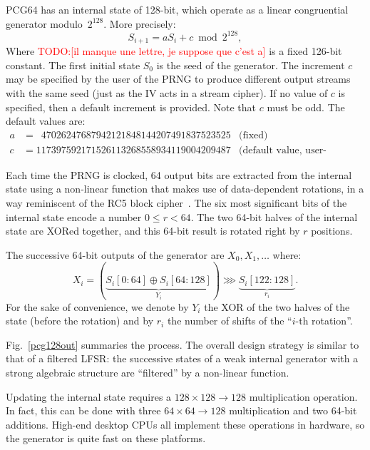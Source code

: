 \documentclass[submission,svgnames,journal=tosc]{iacrtrans}
\newcommand{\todo}[1]{\textcolor{red}{TODO:[#1]}}
\begin{document}
\textsf{PCG64} has an internal state of 128-bit, which operate as a linear
congruential generator modulo~$2^{128}$. More precisely:
\[
  S_{i+1} = a S_i + c \bmod 2^{128},
\]
Where \todo{il manque une lettre, je suppose que c'est a} is a fixed 126-bit constant. The first initial state $S_0$ is the seed of
the generator. The increment $c$ may be specified by the user of the PRNG to
produce different output streams with the same seed (just as the IV acts in a
stream cipher). If no value of $c$ is specified, then a default increment is
provided. Note that $c$ must be odd. The default values are:
\begin{align*}
  a &= \phantom{1}47026247687942121848144207491837523525 & \text{(fixed)}\\
  c &= 117397592171526113268558934119004209487           & \text{(default value, user-definable)}
\end{align*}

Each time the PRNG is clocked, 64 output bits are extracted from the internal
state using a non-linear function that makes use of data-dependent rotations, in
a way reminiscent of the \textsf{RC5} block cipher~\cite{Rivest94}. The six most
significant bits of the internal state encode a number $0 \leq r < 64$. The two
64-bit halves of the internal state are XORed together, and this 64-bit result
is rotated right by $r$ positions.

The successive 64-bit outputs of the generator are $X_0, X_1, \dots$ where:
\begin{equation}\label{eq:output}
  X_i =(\underbrace{S_i[0:64] \oplus S_i[64:128]}_{Y_i}) \ggg \underbrace{S_i[122:128]}_{r_i}.
\end{equation}
For the sake of convenience, we denote by $Y_i$ the XOR of the two halves of the
state (before the rotation) and by $r_i$ the number of shifts of the ``$i$-th
rotation''.

Fig.~\ref{pcg128out} summaries the process. The overall design strategy is
similar to that of a filtered LFSR: the successive states of a weak internal
generator with a strong algebraic structure are ``filtered'' by a non-linear
function.

Updating the internal state requires a $128 \times 128 \rightarrow 128$
multiplication operation. In fact, this can be done with three
$64 \times 64 \rightarrow 128$ multiplication and two 64-bit additions. High-end
desktop CPUs all implement these operations in hardware, so the generator is
quite fast on these platforms.
\end{document}
